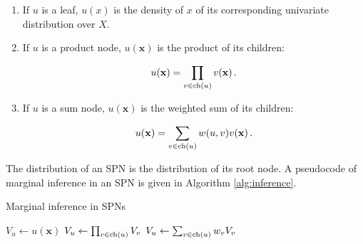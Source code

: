 \begin{enumerate}
  \item If $u$ is a leaf, $u(x)$ is the density of $x$ of its corresponding univariate distribution over $X$.
  \item If $u$ is a product node, $u(\mathbf{x})$ is the product of its children:

        \begin{equation}
          u(\mathbf{x}) = \prod_{v \in \operatorname*{ch}(u)} v(\mathbf{x}) \, .
        \end{equation}
  \item If $u$ is a sum node, $u(\mathbf{x})$ is the weighted sum of its children:

        \begin{equation}
          u(\mathbf{x}) = \sum_{v \in \operatorname*{ch}(u)} w(u, v)v(\mathbf{x}) \, .
        \end{equation}
\end{enumerate}

\noindent The distribution of an SPN is the distribution of its root node. A pseudocode of marginal inference in an SPN is given in Algorithm \ref{alg:inference}.

\begin{algorithm}[h]
  \caption{Marginal inference in SPNs}
  \label{alg:inference}
  \begin{algorithmic}
  \end{algorithmic}
  \begin{algorithmic}[1]
    \State $V_u \gets u(\mathbf{x})$
    \State $V_u \gets \prod_{v \in \operatorname*{ch}(u)} V_v$
    \State $V_u \gets \sum_{v \in \operatorname*{ch}(u)} w_v V_v$
    \EndIf
    \EndFor
    \State {}
  \end{algorithmic}
\end{algorithm}

